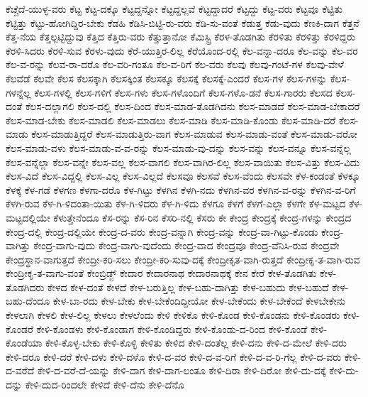 {ಕೆಚ್ಚೆದೆ-ಯುಳ್ಳ-ವರು
ಕೆಟ್ಟ
ಕೆಟ್ಟ-ದಕ್ಕೊ
ಕೆಟ್ಟದ್ದನ್ನೋ
ಕೆಟ್ಟದ್ದಲ್ಲವೆ
ಕೆಟ್ಟದ್ದಾದರೆ
ಕೆಟ್ಟದ್ದು
ಕೆಟ್ಟ-ವರು
ಕೆಟ್ಟವೂ
ಕೆಟ್ಟಿತು
ಕೆಟ್ಟಿತ್ತು
ಕೆಟ್ಟು-ಹೋಗಿದ್ದಿರ-ಬೇಕು
ಕೆಡಹಿ
ಕೆಡಿಸಿ-ಬಿಟ್ಟಿ-ರು-ವರು
ಕೆಡಿ-ಸು-ವಂತೆ
ಕೆಡುತ್ತ
ಕೆಡು-ವುದು
ಕೆಣಕಿ-ದಾಗ
ಕೆತ್ತನೆ
ಕೆತ್ತ-ನೆಯ
ಕೆತ್ತಲ್ಪಟ್ಟಿದ್ದುವು
ಕೆತ್ತಿದ
ಕೆತ್ತಿರು-ವರು
ಕೆತ್ತುತ್ತಾನೋ
ಕೆಮಿಸ್ಟ್ರಿ
ಕೆರಳ-ತೊಡಗಿತು
ಕೆರಳಿತು
ಕೆರಳಿತ್ತು
ಕೆರಳಿದ್ದರು
ಕೆರಳಿ-ಸಿದರು
ಕೆರಳಿ-ಸುವ
ಕೆರಳು-ವುದು
ಕೆರೆ-ಯುತ್ತಿರ-ಲಿಲ್ಲ
ಕೆರೆಯೊಂದ-ರಲ್ಲಿ
ಕೆಲ-ವನ್ನಾ-ದರೂ
ಕೆಲ-ವನ್ನು
ಕೆಲ-ವರ
ಕೆಲ-ವ-ರನ್ನು
ಕೆಲವ-ರಾ-ದರೊ
ಕೆಲ-ವರಿ-ಗಂತೂ
ಕೆಲ-ವ-ರಿಗೆ
ಕೆಲ-ವರು
ಕೆಲವು
ಕೆಲವು-ಗಂಟೆ-ಗಳ
ಕೆಲವು-ವೇಳೆ
ಕೆಲವೆಡೆ
ಕೆಲವೇ
ಕೆಲಸ
ಕೆಲಸಕ್ಕಾಗಿ
ಕೆಲಸಕ್ಕಿಂತ
ಕೆಲಸಕ್ಕೂ
ಕೆಲಸಕ್ಕೆ
ಕೆಲಸಕ್ಕೆ-ಎಂದರೆ
ಕೆಲಸ-ಗಳ
ಕೆಲಸ-ಗಳನ್ನು
ಕೆಲಸ-ಗಳನ್ನೆಲ್ಲ
ಕೆಲಸ-ಗಳಲ್ಲಿ
ಕೆಲಸ-ಗಳಿಗೆ
ಕೆಲಸ-ಗಳು
ಕೆಲಸ-ಗಳೊಂದಿಗೆ
ಕೆಲಸ-ಗಳೊ-ಡನೆ
ಕೆಲಸ-ಗಾರರು
ಕೆಲಸದ
ಕೆಲಸ-ದಂತೆ
ಕೆಲಸ-ದಲ್ಲಾಗಲಿ
ಕೆಲಸ-ದಲ್ಲಿ
ಕೆಲಸ-ದಿಂದ
ಕೆಲಸ-ಮಾಡ-ತೊಡಗಿದನು
ಕೆಲಸ-ಮಾಡದೆ
ಕೆಲಸ-ಮಾಡ-ಬೇಕಾದರೆ
ಕೆಲಸ-ಮಾಡ-ಬೇಕು
ಕೆಲಸ-ಮಾಡಲಿ
ಕೆಲಸ-ಮಾಡಲು
ಕೆಲಸ-ಮಾಡಿ
ಕೆಲಸ-ಮಾಡಿ-ಕೊಂಡು
ಕೆಲಸ-ಮಾಡಿ-ದರೆ
ಕೆಲಸ-ಮಾಡು
ಕೆಲಸ-ಮಾಡುತ್ತಿದ್ದರೆ
ಕೆಲಸ-ಮಾಡುತ್ತಿರು-ವಾಗ
ಕೆಲಸ-ಮಾಡುವ
ಕೆಲಸ-ಮಾಡು-ವಂತೆ
ಕೆಲಸ-ಮಾಡು-ವರೋ
ಕೆಲಸ-ಮಾಡು-ವಳು
ಕೆಲಸ-ಮಾಡು-ವ-ವ-ರನ್ನು
ಕೆಲಸ-ಮಾಡು-ವು-ದನ್ನು
ಕೆಲಸ-ವನ್ನು
ಕೆಲಸ-ವನ್ನೂ
ಕೆಲಸ-ವನ್ನೆಲ್ಲ
ಕೆಲಸ-ವನ್ನೆಲ್ಲಾ
ಕೆಲಸ-ವನ್ನೇ
ಕೆಲಸ-ವಲ್ಲ
ಕೆಲಸ-ವಾಗಲಿ
ಕೆಲಸ-ವಾಗಿರ-ಲಿಲ್ಲ
ಕೆಲಸ-ವಾಯಿತು
ಕೆಲಸ-ವಿತ್ತು
ಕೆಲಸ-ವಿದು
ಕೆಲಸ-ವಿದೆ
ಕೆಲಸ-ವಿದ್ದಲ್ಲಿ
ಕೆಲಸ-ವಿಲ್ಲ
ಕೆಲಸ-ವಿಲ್ಲದೆ
ಕೆಲಸವೂ
ಕೆಲಸವೆ
ಕೆಲಸ-ವೆಂದು
ಕೆಲಸವೇ
ಕೆಳ-ಕಂಡಂತೆ
ಕೆಳಕ್ಕೂ
ಕೆಳಕ್ಕೆ
ಕೆಳ-ಗಡೆ
ಕೆಳಗಣ
ಕೆಳಗಾ-ದರೊ
ಕೆಳ-ಗಿಟ್ಟು
ಕೆಳಗಿನ
ಕೆಳಗಿ-ನದು
ಕೆಳಗಿನ-ವರ
ಕೆಳಗಿನ-ವ-ರನ್ನು
ಕೆಳಗಿನ-ವ-ರಿಗೆ
ಕೆಳಗಿ-ರುವ
ಕೆಳ-ಗಿ-ಳಿದಂತಾ-ಯಿತು
ಕೆಳ-ಗಿ-ಳಿದರು
ಕೆಳ-ಗಿ-ಳಿದು
ಕೆಳಗೂ
ಕೆಳಗೆ
ಕೆಳಗೆ-ಎಲ್ಲಾ
ಕೆಳಗೇ
ಕೆಳ-ಮಟ್ಟದ
ಕೆಳ-ಮಟ್ಟದಲ್ಲಿಯೇ
ಕೆಳುತ್ತೇನೆಂದೂ
ಕೆಸ-ರನ್ನು
ಕೆಸ-ರಿನ
ಕೆಸರಿ-ನಲ್ಲಿ
ಕೆಸರು
ಕೇ
ಕೇಂದ್ರ
ಕೇಂದ್ರಕ್ಕೆ
ಕೇಂದ್ರ-ಗಳನ್ನು
ಕೇಂದ್ರದ
ಕೇಂದ್ರ-ದಲ್ಲಿ
ಕೇಂದ್ರ-ದಲ್ಲಿಯೇ
ಕೇಂದ್ರ-ದ-ವರು
ಕೇಂದ್ರ-ವನ್ನಾಗಿ
ಕೇಂದ್ರ-ವನ್ನು
ಕೇಂದ್ರ-ವಾ-ಗಿಟ್ಟು-ಕೊಂಡು
ಕೇಂದ್ರ-ವಾಗಿತ್ತು
ಕೇಂದ್ರ-ವಾಗು-ವುದು
ಕೇಂದ್ರ-ವಾಗು-ವುದೆಂದು
ಕೇಂದ್ರ-ವಾದ
ಕೇಂದ್ರವೂ
ಕೇಂದ್ರ-ವೆನಿಸಿ-ರುವ
ಕೇಂದ್ರವೇ
ಕೇಂದ್ರಸ್ಥಾನ-ವಾಗುತ್ತದೆ
ಕೇಂದ್ರೀ-ಕರಿ-ಸಲು
ಕೇಂದ್ರೀ-ಕರಿ-ಸುವು-ದಕ್ಕೆ
ಕೇಂದ್ರೀಕೃತ-ವಾಗಿ-ರುತ್ತದೆ
ಕೇಂದ್ರೀಕೃ-ತ-ವಾಗಿ-ರುವ
ಕೇಂದ್ರೀಕೃ-ತ-ವಾಗು-ವಂತೆ
ಕೇಂಬ್ರಿಡ್ಜ್
ಕೇದಾರ
ಕೇದಾರನಾಥ
ಕೇದಾರನಾಥಕ್ಕೆ
ಕೇನ
ಕೇರೆ
ಕೇಳ-ತೊಡಗಿತು
ಕೇಳ-ತೊಡಗಿದರು
ಕೇಳದ
ಕೇಳ-ದಂತೆ
ಕೇಳದೆ
ಕೇಳ-ಬರುತ್ತಿಲ್ಲ
ಕೇಳ-ಬಹು-ದಾಗಿತ್ತು
ಕೇಳ-ಬಹುದು
ಕೇಳ-ಬಹುದೆ
ಕೇಳ-ಬಹು-ದೆಂದೂ
ಕೇಳ-ಬಾ-ರದು
ಕೇಳ-ಬೇಕು
ಕೇಳ-ಬೇಕೆಂದಿದ್ದೀಯೋ
ಕೇಳ-ಬೇಕೆಂದು
ಕೇಳ-ಬೇಕೆಂದೆ
ಕೇಳಬೇಕೇನು
ಕೇಳಲಾಗಿ
ಕೇಳಲಿ
ಕೇಳ-ಲಿಲ್ಲ
ಕೇಳಲು
ಕೇಳಲೆಂದು
ಕೇಳಿ
ಕೇಳಿಕೊ
ಕೇಳಿ-ಕೊಂಡ
ಕೇಳಿ-ಕೊಂಡನು
ಕೇಳಿ-ಕೊಂಡರು
ಕೇಳಿ-ಕೊಂಡರೆ
ಕೇಳಿ-ಕೊಂಡಳು
ಕೇಳಿ-ಕೊಂಡಾಗ
ಕೇಳಿ-ಕೊಂಡಿದ್ದರು
ಕೇಳಿ-ಕೊಂಡು-ದ-ರಿಂದ
ಕೇಳಿ-ಕೊಂಡೆ
ಕೇಳಿ-ಕೊಂಡೆಯಾ
ಕೇಳಿ-ಕೊಳ್ಳ-ಬೇಕು
ಕೇಳಿ-ಕೊಳ್ಳಿ
ಕೇಳಿತು
ಕೇಳಿದ
ಕೇಳಿ-ದಂತೆಲ್ಲ
ಕೇಳಿ-ದನು
ಕೇಳಿ-ದ-ಮೇಲೆ
ಕೇಳಿ-ದರು
ಕೇಳಿ-ದರೂ
ಕೇಳಿ-ದರೆ
ಕೇಳಿ-ದಳು
ಕೇಳಿ-ದಳೊ
ಕೇಳಿ-ದ-ವರ
ಕೇಳಿ-ದ-ವ-ರಿಗೆ
ಕೇಳಿ-ದ-ವ-ರಿ-ಗೆಲ್ಲ
ಕೇಳಿ-ದ-ವರು
ಕೇಳಿ-ದ-ವರೆದೆ
ಕೇಳಿ-ದ-ವರೆ-ದೆ-ಯನ್ನು
ಕೇಳಿ-ದಾಗ
ಕೇಳಿ-ದಾಗ-ಲಂತೂ
ಕೇಳಿ-ದಿರಾ
ಕೇಳಿ-ದಿರೋ
ಕೇಳಿ-ದು-ದಕ್ಕೆ
ಕೇಳಿ-ದು-ದನ್ನು
ಕೇಳಿ-ದುದ-ರಿಂದಲೇ
ಕೇಳಿದೆ
ಕೇಳಿ-ದೆನು
ಕೇಳಿ-ದೆನೊ
}
